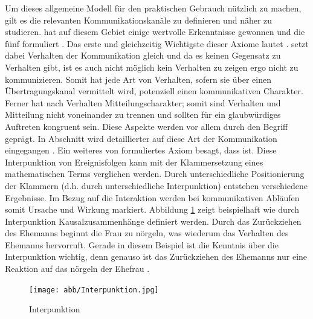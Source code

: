 Um dieses allgemeine Modell für den praktischen Gebrauch nützlich zu machen, gilt es die relevanten Kommunikationskanäle zu definieren und näher zu studieren.
 hat auf diesem Gebiet einige wertvolle Erkenntnisse gewonnen und die fünf  formuliert \citep{grundlagen-der-kommunikation}.
Das erste und gleichzeitig Wichtigste dieser Axiome lautet  \citep[S. 53]{watzlawick}.
 setzt dabei Verhalten der Kommunikation gleich und da es keinen Gegensatz zu Verhalten gibt, ist es auch nicht möglich kein Verhalten zu zeigen ergo nicht zu kommunizieren.
Somit hat jede Art von Verhalten, sofern sie über einen Übertragungskanal vermittelt wird, potenziell einen kommunikativen Charakter.
Ferner hat nach  Verhalten Mitteilungscharakter; somit sind Verhalten und Mitteilung nicht voneinander zu trennen und sollten für ein glaubwürdiges Auftreten kongruent sein.
Diese Aspekte werden vor allem durch den Begriff  geprägt.
In Abschnitt  wird detaillierter auf diese Art der Kommunikation eingegangen \citep{grundlagen-der-kommunikation}.
Ein weiteres von  formuliertes Axiom besagt, dass  \citep[S. 61]{watzlawick} ist.
Diese Interpunktion von Ereignisfolgen kann mit der Klammersetzung eines mathematischen Terms verglichen werden.
Durch unterschiedliche Positionierung der Klammern (d.h. durch unterschiedliche Interpunktion) entstehen verschiedene Ergebnisse.
Im Bezug auf die Interaktion werden bei kommunikativen Abläufen somit Ursache und Wirkung markiert.
Abbildung \ref{fig:interpunktion} zeigt beispielhaft wie durch Interpunktion Kausalzusammenhänge definiert werden.
Durch das Zurückziehen des Ehemanns beginnt die Frau zu nörgeln, was wiederum das Verhalten des Ehemanns hervorruft.
Gerade in diesem Beispiel ist die Kenntnis über die Interpunktion wichtig, denn genauso ist das Zurückziehen des Ehemanns nur eine Reaktion auf das nörgeln der Ehefrau \citep{grundlagen-der-kommunikation}.
\begin{figure}[htbp]
	\centering
	\texttt{[image: abb/Interpunktion.jpg]}
	\caption{Interpunktion}
	\label{fig:interpunktion}
\end{figure}

